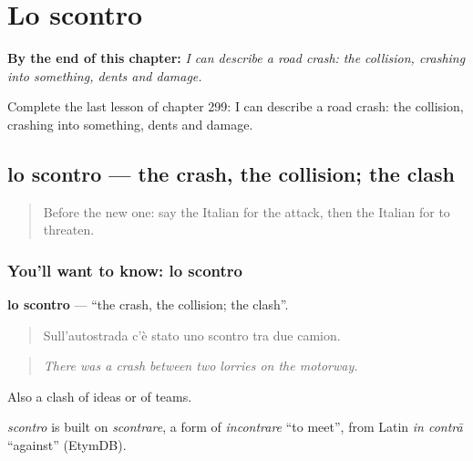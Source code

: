 
\chapter{Lo scontro}
\label{ch:it-lo-scontro}

\begin{chapteropening}
\textbf{By the end of this chapter:} \emph{I can describe a road crash: the collision, crashing into something, dents and damage.}

Complete the last lesson of chapter 299: I can describe a road crash: the collision, crashing into something, dents and damage.
\end{chapteropening}

\section[lo scontro]{lo scontro — the crash, the collision; the clash}

\label{lesson:IT-C299-scontro}



\begin{quote}
Before the new one: say the Italian for the attack, then the Italian for to threaten.
\end{quote}

\subsection*{You'll want to know: lo scontro}
\textbf{lo scontro} — \textquotedblleft{}the crash, the collision; the clash\textquotedblright{}.

\begin{quote}
Sull'autostrada c'è stato uno scontro tra due camion.
\end{quote}

\begin{quote}
\emph{There was a crash between two lorries on the motorway.}
\end{quote}

Also a clash of ideas or of teams.

\begin{cousinweb}
\emph{scontro} is built on \emph{scontrare}, a form of \emph{incontrare} \textquotedblleft{}to meet\textquotedblright{}, from Latin \emph{in contrā} \textquotedblleft{}against\textquotedblright{} (EtymDB).
\end{cousinweb}

